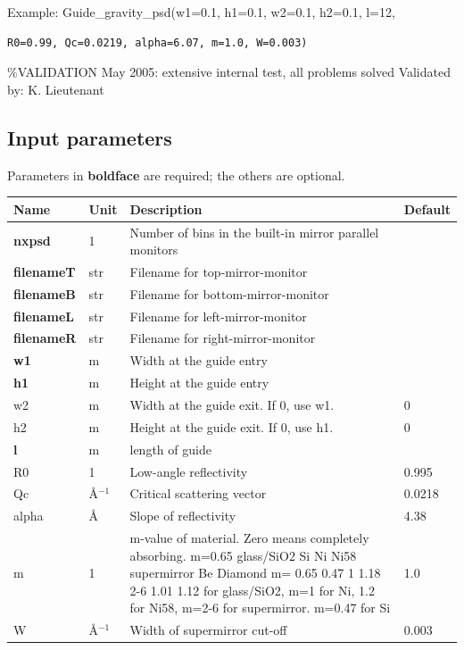 Example: Guide\_gravity\_psd(w1=0.1, h1=0.1, w2=0.1, h2=0.1, l=12,

\begin{verbatim}
R0=0.99, Qc=0.0219, alpha=6.07, m=1.0, W=0.003)
\end{verbatim}

\%VALIDATION May 2005: extensive internal test, all problems solved Validated by: K. Lieutenant

\subsection*{Input parameters}
Parameters in \textbf{boldface} are required; the others are optional.

\begin{longtable}{p{}p{}p{}p{}}
\toprule
\textbf{Name} & \textbf{Unit} & \textbf{Description} & \textbf{Default} \\
\midrule
\endhead
\textbf{nxpsd} & 1 & Number of bins in the built-in mirror parallel monitors &  \\
\textbf{filenameT} & str & Filename for top-mirror-monitor &  \\
\textbf{filenameB} & str & Filename for bottom-mirror-monitor &  \\
\textbf{filenameL} & str & Filename for left-mirror-monitor &  \\
\textbf{filenameR} & str & Filename for right-mirror-monitor &  \\
\textbf{w1} & m & Width at the guide entry &  \\
\textbf{h1} & m & Height at the guide entry &  \\
w2 & m & Width at the guide exit. If 0, use w1. & 0 \\
h2 & m & Height at the guide exit. If 0, use h1. & 0 \\
\textbf{l} & m & length of guide &  \\
R0 & 1 & Low-angle reflectivity & 0.995 \\
Qc & \AA{}$^{-1}$ & Critical scattering vector & 0.0218 \\
alpha & \AA{} & Slope of reflectivity & 4.38 \\
m & 1 & m-value of material. Zero means completely absorbing. m=0.65 glass/SiO2 Si   Ni  Ni58  supermirror Be    Diamond m=  0.65       0.47 1   1.18  2-6         1.01  1.12 for glass/SiO2, m=1 for Ni, 1.2 for Ni58, m=2-6 for supermirror. m=0.47 for Si & 1.0 \\
W & \AA{}$^{-1}$ & Width of supermirror cut-off & 0.003 \\

\end{longtable}

